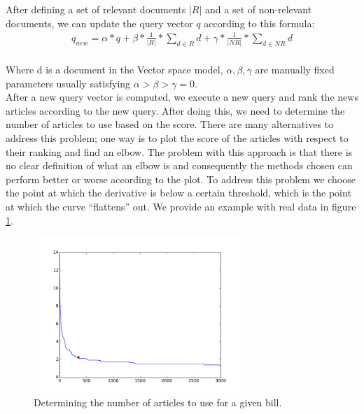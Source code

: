 After defining a set of relevant documents $|R|$ and a set of non-relevant documents, we can update the query vector $q$ according to this formula: \\

\begin{eqnarray*}
q_{new} = \alpha* q +  \beta * \frac{1}{|R|} * \sum_{d \in R}{d} + \gamma * \frac{1}{|NR|} * \sum_{d \in NR}{d} \\
\end{eqnarray*}

Where d is a document in the Vector space model, $\alpha, \beta, \gamma $ are manually fixed parameters usually satisfying $\alpha > \beta > \gamma = 0$. \\

After a new query vector is computed, we execute a new query and rank the news articles according to the new query. After doing this, we need to determine the number of articles to use based on the score. There are many alternatives to address this problem; one way is to plot the score of the articles with respect to their ranking and find an elbow. The problem with this approach is that there is no clear definition of what an elbow is and consequently the methods chosen can perform better or worse according to the plot. To address this problem we choose the point at which the derivative is below a certain threshold, which is the point at which the curve ``flattens'' out. We provide an example with real data in figure \ref{fig:articles-topic-threshold}. \\

\begin{figure}[h!]
    \centering
    \includegraphics[width=0.7\textwidth]{figs/articles-topic-threshold}
    \caption{Determining the number of articles to use for a given bill.}
    \label{fig:articles-topic-threshold}
\end{figure}

